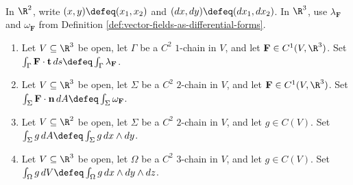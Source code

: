 \begin{definition} \label{def:vector-calculus-integral-notation} \\
In $\R^2$, write $(x,y)\defeq(x_1,x_2)$ and $(dx,dy)\defeq(dx_1,dx_2)$. In $\R^3$, use $\lambda_{\mathbf{F}}$ and $\omega_{\mathbf{F}}$ from Definition \ref{def:vector-fields-as-differential-forms}.
\begin{enumerate}[label=(\roman*)]
\setlength{\itemsep}{0pt}
\item Let $V\subseteq\R^3$ be open, let $\Gamma$ be a $C^2$ $1$-chain in $V$, and let $\mathbf{F}\in C^1(V,\R^3)$. Set $\int_\Gamma\mathbf{F}\cdot\mathbf{t}\,ds\defeq\int_\Gamma\lambda_{\mathbf{F}}$.
\item Let $V\subseteq\R^3$ be open, let $\Sigma$ be a $C^2$ $2$-chain in $V$, and let $\mathbf{F}\in C^1(V,\R^3)$. Set $\int_\Sigma\mathbf{F}\cdot\mathbf{n}\,dA\defeq\int_\Sigma\omega_{\mathbf{F}}$.
\item Let $V\subseteq\R^2$ be open, let $\Sigma$ be a $C^2$ $2$-chain in $V$, and let $g\in C(V)$. Set $\int_\Sigma g\,dA\defeq\int_\Sigma g\,dx\wedge dy$.
\item Let $V\subseteq\R^3$ be open, let $\Omega$ be a $C^2$ $3$-chain in $V$, and let $g\in C(V)$. Set $\int_\Omega g\,dV\defeq\int_\Omega g\,dx\wedge dy\wedge dz$.
\end{enumerate}
\end{definition}

